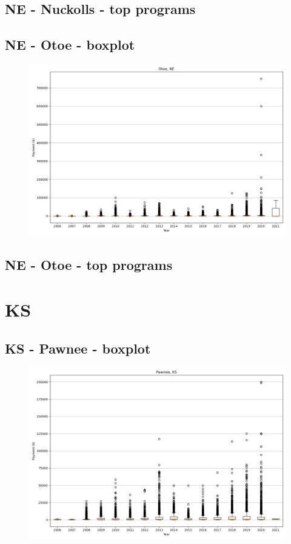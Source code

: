 \subsection*{NE - Nuckolls - top programs}

\newpage
\subsection*{NE - Otoe - boxplot}
\begin{figure}[h]
\centering
\includegraphics[width=7in]{../output/boxplots/counties/Otoe-NE_boxplot.png}
\end{figure}


\subsection*{NE - Otoe - top programs}

\newpage
\section*{KS}
\subsection*{KS - Pawnee - boxplot}
\begin{figure}[h]
\centering
\includegraphics[width=7in]{../output/boxplots/counties/Pawnee-KS_boxplot.png}
\end{figure}


